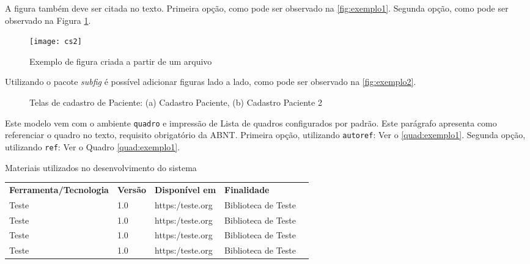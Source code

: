 A figura também deve ser citada no texto. Primeira opção, como pode ser observado na \autoref{fig:exemplo1}. Segunda opção, como pode ser observado na Figura \ref{fig:exemplo1}.

\begin{figure}[htb]%
  \caption{Exemplo de figura criada a partir de um arquivo}%
  \label{fig:exemplo1}%
  \texttt{[image: cs2]}%
\end{figure}

Utilizando o pacote \textit{subfig} é possível adicionar figuras lado a lado, como pode ser observado na \autoref{fig:exemplo2}.

\begin{figure}[htb]
  \caption{Telas de cadastro de Paciente: (a) Cadastro Paciente, (b) Cadastro Paciente 2}
  \label{fig:exemplo2}
  \centering
  \hspace{0.15cm}

  \fonte{}
\end{figure}

Este modelo vem com o ambiente \texttt{quadro} e impressão de Lista de quadros
configurados por padrão.  Este parágrafo apresenta como referenciar o quadro no texto, requisito obrigatório da ABNT. Primeira opção, utilizando \texttt{autoref}: Ver o \autoref{quad:exemplo1}. Segunda opção, utilizando  \texttt{ref}: Ver o Quadro \ref{quad:exemplo1}.

\begin{tabframed}[htb]%
  \caption{Materiais utilizados no desenvolvimento do sistema}%
  \label{quad:exemplo1}%
  \renewcommand{\arraystretch}{1.5}
  \begin{tabular}{|l|l|l|l|l}
    \cline{1-4}
    \textbf{Ferramenta/Tecnologia} & \textbf{Versão} & \textbf{Disponível em} & \textbf{Finalidade}   \\ \cline{1-4}
    Teste                          & 1.0             & https:/teste.org       & Biblioteca de Teste & \\ \cline{1-4}
    Teste                          & 1.0             & https:/teste.org       & Biblioteca de Teste & \\ \cline{1-4}
    Teste                          & 1.0             & https:/teste.org       & Biblioteca de Teste & \\ \cline{1-4}
    Teste                          & 1.0             & https:/teste.org       & Biblioteca de Teste & \\ \cline{1-4}
  \end{tabular}
  \fonte{}%
\end{tabframed}


